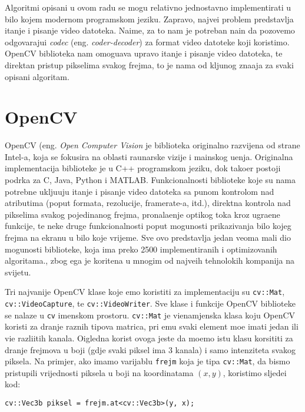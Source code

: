Algoritmi opisani u ovom radu se mogu relativno jednostavno implementirati u bilo kojem modernom programskom jeziku. Zapravo, najve\cj i problem predstavlja \ch itanje i pisanje video datoteka. Naime,
za to nam je potreban na\ch in da pozovemo odgovaraju\cj i \textit{codec} (eng. \textit{coder-decoder}) za format video datoteke koji koristimo. OpenCV biblioteka nam omogu\cj ava upravo \ch itanje
i pisanje video datoteka, te direktan pristup pikselima svakog frejma, \sh to je nama od klju\ch nog zna\ch aja za svaki opisani algoritam.

\section{OpenCV} %
OpenCV (eng. \textit{Open Computer Vision} je biblioteka originalno razvijena od strane Intel-a, koja se fokusira na oblasti ra\ch unarske vizije i ma\sh inskog u\ch enja. Originalna implementacija biblioteke
je u C++ programskom jeziku, dok tako\dj er postoji podr\sh ka za C, Java, Python i MATLAB. Funkcionalnosti biblioteke koje su nama potrebne uklju\ch uju \ch itanje i pisanje video datoteka sa punom
kontrolom nad atributima (poput formata, rezolucije, framerate-a, itd.), direktna kontrola nad pikselima svakog pojedina\ch nog frejma, pronala\zh enje opti\ch kog toka kroz ugra\dj ene funkcije, te neke
druge funkcionalnosti poput mogu\cj nosti prikazivanja bilo kojeg frejma na ekranu u bilo koje vrijeme. Sve ovo predstavlja jedan veoma mali dio mogu\cj nosti biblioteke, koja ima preko 2500 implementiranih
i optimizovanih algoritama., zbog \ch ega je kori\sh tena u mnogim od najve\cj ih tehnolo\sh kih kompanija na svijetu.

Tri najva\zh nije OpenCV klase koje \cj emo koristiti za implementaciju su \lstinline{cv::Mat}, \lstinline{cv::VideoCapture}, te \lstinline{cv::VideoWriter}. Sve klase i funkcije OpenCV biblioteke se nalaze u \lstinline{cv}
imenskom prostoru. \lstinline{cv::Mat} je vi\sh enamjenska klasa koju OpenCV koristi za dr\zh anje raznih tipova matrica, pri \ch emu svaki element mo\zh e imati jedan ili vi\sh e razli\ch itih kanala. O\ch igledna
korist ovoga jeste da mo\zh emo istu klasu korsititi za dr\zh anje frejmova u boji (gdje svaki piksel ima 3 kanala) i samo intenziteta svakog piksela. Na primjer, ako imamo varijablu \lstinline{frejm} koja je tipa
\lstinline{cv::Mat}, da bismo pristupili vrijednosti piksela u boji na koordinatama $(x,y)$, koristimo sljede\cj i kod:
\begin{lstlisting}
cv::Vec3b piksel = frejm.at<cv::Vec3b>(y, x);
\end{lstlisting}

